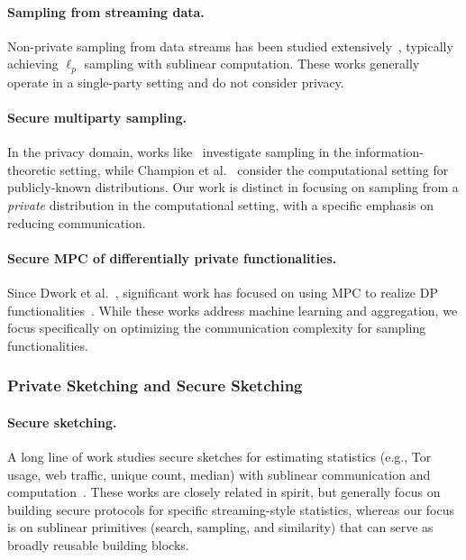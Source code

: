 \paragraph{Sampling from streaming data.}
Non-private sampling from data streams has been studied extensively~\cite{cormode2019p,ganguly2007counting,jowhari2011tight,MW10,woodruff2016distributed}, typically achieving $\ell_p$ sampling with sublinear computation. These works generally operate in a single-party setting and do not consider privacy.

\paragraph{Secure multiparty sampling.}
In the privacy domain, works like~\cite{prabhakaran2012secure,prabhakaran2014assisted} investigate sampling in the information-theoretic setting, while Champion et al.~\cite{CCS:ChasheUll19} consider the computational setting for publicly-known distributions. Our work is distinct in focusing on sampling from a \emph{private} distribution in the computational setting, with a specific emphasis on reducing communication.

\paragraph{Secure MPC of differentially private functionalities.}
Since Dwork et al.~\cite{dwork2006our}, significant work has focused on using MPC to realize DP functionalities~\cite{acar2017achieving,clifton2013challenges,eriguchi2021efficient}. While these works address machine learning and aggregation, we focus specifically on optimizing the communication complexity for sampling functionalities.

\subsubsection{Private Sketching and Secure Sketching}
\paragraph{Secure sketching.}
A long line of work studies secure sketches for estimating statistics (e.g., Tor usage, web traffic, unique count, median) with sublinear communication and computation~\cite{CCS:ElaDanGol14,CCS:JanJoh16,NDSS:MelDanDec16,CCS:WJSYG19,PoPETS:CDKY20}. These works are closely related in spirit, but generally focus on building secure protocols for specific streaming-style statistics, whereas our focus is on sublinear primitives (search, sampling, and similarity) that can serve as broadly reusable building blocks.


